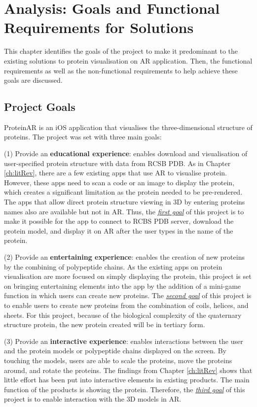 \chapter{Analysis: Goals and Functional Requirements for Solutions}
\label{ch:analysis2}

This chapter identifies the goals of the project to make it predominant to the existing solutions to protein visualisation on AR application. Then, the functional requirements as well as the non-functional requirements to help achieve these goals are discussed. 

\section{Project Goals}
ProteinAR is an iOS application that visualises the three-dimensional structure of proteins. The project was set with three main goals:

(1) Provide an \textbf{educational experience}: enables download and visualisation of user-specified protein structure with data from RCSB PDB. As in Chapter \ref{ch:litRev}, there are a few existing apps that use AR to visualise protein. However, these apps need to scan a code or an image to display the protein, which creates a significant limitation as the protein needed to be pre-rendered. The apps that allow direct protein structure viewing in 3D by entering proteins names also are available but not in AR. 
Thus, the \emph{\underline{first goal}} of this project is to make it possible for the app to connect to RCBS PDB server, download the protein model, and display it on AR after the user types in the name of the protein. 

(2) Provide an \textbf{entertaining experience}: enables the creation of new proteins by the combining of polypeptide chains. As the existing apps on protein visualisation are more focused on simply displaying the protein, this project is set on bringing entertaining elements into the app by the addition of a mini-game function in which users can create new proteins. 
The \emph{\underline{second goal}} of this project is to enable users to create new proteins from the combination of coils, helices, and sheets. For this project, because of the biological complexity of the quaternary structure protein, the new protein created will be in tertiary form. 

(3) Provide an \textbf{interactive experience}: enables interactions between the user and the protein models or polypeptide chains displayed on the screen. By touching the models, users are able to scale the proteins, move the proteins around, and rotate the proteins. The findings from Chapter \ref{ch:litRev} shows that little effort has been put into interactive elements in existing products. The main function of the products is showing the protein. Therefore, the  \emph{\underline{third goal}} of this project is to enable interaction with the 3D models in AR.

